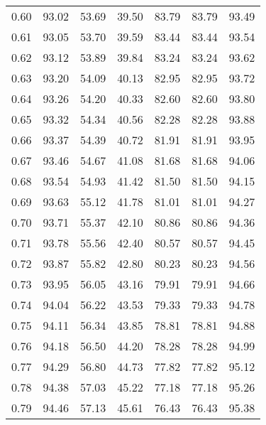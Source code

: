 \begin{tabular}{|c|c|c|c|c|c|c|}
      0.60 &     93.02 &     53.69 &      39.50 &   83.79 &      83.79 &         93.49 \\
      0.61 &     93.05 &     53.70 &      39.59 &   83.44 &      83.44 &         93.54 \\
      0.62 &     93.12 &     53.89 &      39.84 &   83.24 &      83.24 &         93.62 \\
      0.63 &     93.20 &     54.09 &      40.13 &   82.95 &      82.95 &         93.72 \\
      0.64 &     93.26 &     54.20 &      40.33 &   82.60 &      82.60 &         93.80 \\
      0.65 &     93.32 &     54.34 &      40.56 &   82.28 &      82.28 &         93.88 \\
      0.66 &     93.37 &     54.39 &      40.72 &   81.91 &      81.91 &         93.95 \\
      0.67 &     93.46 &     54.67 &      41.08 &   81.68 &      81.68 &         94.06 \\
      0.68 &     93.54 &     54.93 &      41.42 &   81.50 &      81.50 &         94.15 \\
      0.69 &     93.63 &     55.12 &      41.78 &   81.01 &      81.01 &         94.27 \\
      0.70 &     93.71 &     55.37 &      42.10 &   80.86 &      80.86 &         94.36 \\
      0.71 &     93.78 &     55.56 &      42.40 &   80.57 &      80.57 &         94.45 \\
      0.72 &     93.87 &     55.82 &      42.80 &   80.23 &      80.23 &         94.56 \\
      0.73 &     93.95 &     56.05 &      43.16 &   79.91 &      79.91 &         94.66 \\
      0.74 &     94.04 &     56.22 &      43.53 &   79.33 &      79.33 &         94.78 \\
      0.75 &     94.11 &     56.34 &      43.85 &   78.81 &      78.81 &         94.88 \\
      0.76 &     94.18 &     56.50 &      44.20 &   78.28 &      78.28 &         94.99 \\
      0.77 &     94.29 &     56.80 &      44.73 &   77.82 &      77.82 &         95.12 \\
      0.78 &     94.38 &     57.03 &      45.22 &   77.18 &      77.18 &         95.26 \\
      0.79 &     94.46 &     57.13 &      45.61 &   76.43 &      76.43 &         95.38 \\

\end{tabular}
